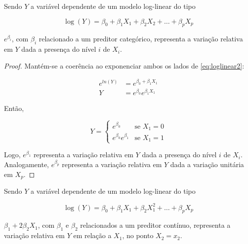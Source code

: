 \begin{apendicesenv}
\begin{proposition}
  \label{proposicao2}

  Sendo $Y$ a variável dependente de um modelo log-linear do tipo
  
  \begin{equation}
    \log(Y) = \beta_0 + \beta_1X_1 + \beta_2X_2 + \ldots + \beta_pX_p
  \end{equation} \label{eq:loglinear2}
  
  \noindent $e^{\beta_i}$, com $\beta_i$ relacionado a um preditor categórico, representa a variação relativa em $Y$ dada a presença do nível $i$ de $X_i$.
\end{proposition}

\begin{proof}
  Mantém-se a coerência ao exponenciar ambos os lados de \eqref{eq:loglinear2}:

  $$
  \begin{aligned}
    e^{ln(Y)} &= e^{\beta_0 + \beta_1X_1} \\
    Y &= e^{\beta_0}e^{\beta_1X_1}
  \end{aligned}
  $$

  Então,

  $$
  Y = 
  \begin{cases}
    e^{\beta_0} & \text{se $X_1=0$} \\
    e^{\beta_0}e^{\beta_1} & \text{se $X_1=1$}
  \end{cases}
  $$

  Logo, $e^{\beta_1}$ representa a variação relativa em $Y$ dada a presença do nível $i$ de $X_i$. Analogamente, $e^{\beta_p}$ representa a variação relativa em $Y$ dada a variação unitária em $X_p$.
\end{proof}

\begin{proposition}
  \label{proposicao3}

  Sendo $Y$ a variável dependente de um modelo log-linear do tipo
  
  \begin{equation}
    \log(Y) = \beta_0 + \beta_1X_1 + \beta_2X^2_1 + \ldots + \beta_pX_p
  \end{equation} \label{eq:loglinear3}
  
  \noindent $\beta_1 + 2\beta_2X_1$, com $\beta_1$ e $\beta_2$ relacionados a um preditor contínuo, representa a variação relativa em $Y$ em relação a $X_1$, no ponto $X_2 = x_2$.
\end{proposition}


\end{apendicesenv}
